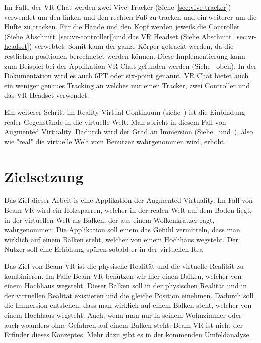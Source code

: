 Im Falle der VR Chat werden zwei Vive Tracker (Siehe~\ref{sec:vive-tracker}) verwendet um den linken und den rechten Fuß zu tracken und ein weiterer um die Hüfte zu tracken.
Für die Hände und den Kopf werden jeweils die Controller (Siehe Abschnitt~\ref{sec:vr-controller})und das VR Headset (Siehe Abschnitt~\ref{sec:vr-headset}) verwebtet.
Somit kann der ganze Körper getrackt werden, da die restlichen positionen berechnetet werden können.
Diese Implementierung kann zum Beispiel bei der Applikation VR Chat gefunden werden (Siehe~\cite{VRCHAT_2021} oben).
In der Dokumentation wird es auch 6PT oder six-point genannt.
VR Chat bietet auch ein weniger genaues Tracking an welches nur einen Tracker, zwei Controller und das VR Headset verwendet.

Ein weiterer Schritt im Reality-Virtual Continuum (siehe~\cite{MILGRAM_1994}) ist die Einbindung realer Gegenstände in die virtuelle Welt.
Man spricht in diesem Fall von Augmented Virtuality.
Dadurch wird der Grad an Immersion (Siehe~\cite{EMEST_ADAMS_2004} und~\cite{BJOERK_2003}), also wie "real" die virtuelle Welt vom Benutzer wahrgenommen wird, erhöht.

\section{Zielsetzung}\label{sec: objective}

Das Ziel dieser Arbeit is eine Applikation der Augmented Virtuality.
Im Fall von Beam VR wird ein Holzsparren, welcher in der realen Welt auf dem Boden liegt, in der virtuellen Welt als Balken, der aus einem Wolkenkratzer ragt, wahrgenommen.
Die Applikation soll einem das Gefühl vermitteln, dass man wirklich auf einem Balken steht, welcher von einem Hochhaus wegsteht.
Der Nutzer soll eine Erhöhung spüren sobald er in der virtuellen Rea



Das Ziel von Beam VR ist die physische Realität und die virtuelle Realität zu kombinieren.
Im Falle Beam VR benützen wir hier einen Balken, welcher von einem Hochhaus wegsteht.
Dieser Balken soll in der physischen Realität und in der virtuellen Realität existieren und die gleiche Position einehmen.
Dadurch soll die Immersion entstehen, dass man wirklich auf einem Balken steht, welcher von einem Hochhaus wegsteht.
Auch, wenn man nur in seinem Wohnzimmer oder auch woanders ohne Gefahren auf einem Balken steht.
Beam VR ist nicht der Erfinder dieses Konzeptes.
Mehr dazu gibt es in der kommenden Umfeldanalyse.

